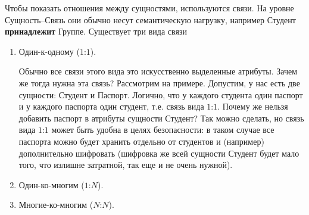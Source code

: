 Чтобы показать отношения между сущностями, используются связи. На уровне
Сущность--Связь они обычно несут семантическую нагрузку, например Студент
\textbf{принадлежит} Группе. Существует три вида связи

\begin{enumerate}
\item 
  Один-к-одному (\(1\):\(1\)).

  Обычно все связи этого вида это искусственно выделенные атрибуты. Зачем же
  тогда нужна эта связь? Рассмотрим на примере. Допустим, у нас есть две
  сущности: Студент и Паспорт. Логично, что у каждого студента один паспорт и у
  каждого паспорта один студент, т.е. связь вида \(1\):\(1\). Почему же нельзя
  добавить паспорт в атрибуты сущности Студент? Так можно сделать, но связь вида
  \(1\):\(1\) может быть удобна в целях безопасности: в таком случае все
  паспорта можно будет хранить отдельно от студентов и (например) дополнительно
  шифровать (шифровка же всей сущности Студент будет мало того, что излишне
  затратной, так еще и не очень нужной).

\item 
  Один-ко-многим (\(1\):\(N\)).

\item 
  Многие-ко-многим (\(N\):\(N\)).
\end{enumerate}
